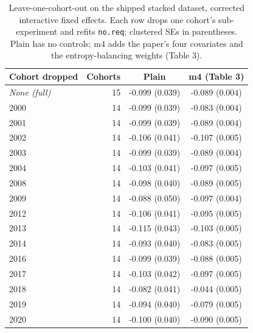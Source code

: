 \begin{table}[t]\centering
\caption{Leave-one-cohort-out on the shipped stacked dataset, corrected interactive fixed effects. Each row drops one cohort's sub-experiment and refits \texttt{no.req}; clustered SEs in parentheses. Plain has no controls; m4 adds the paper's four covariates and the entropy-balancing weights (Table 3).}
\label{tab:loo-shipped}
\begin{tabular}{lrcc}
\toprule
Cohort dropped & Cohorts & Plain & m4 (Table 3) \\
\midrule
\textit{None (full)} & 15 & -0.099 (0.039) & -0.089 (0.004) \\
\midrule
2000 & 14 & -0.099 (0.039) & -0.083 (0.004) \\
2001 & 14 & -0.099 (0.039) & -0.089 (0.004) \\
2002 & 14 & -0.106 (0.041) & -0.107 (0.005) \\
2003 & 14 & -0.099 (0.039) & -0.089 (0.004) \\
2004 & 14 & -0.103 (0.041) & -0.097 (0.005) \\
2008 & 14 & -0.098 (0.040) & -0.089 (0.005) \\
2009 & 14 & -0.088 (0.050) & -0.097 (0.004) \\
2012 & 14 & -0.106 (0.041) & -0.095 (0.005) \\
2013 & 14 & -0.115 (0.043) & -0.103 (0.005) \\
2014 & 14 & -0.093 (0.040) & -0.083 (0.005) \\
2016 & 14 & -0.099 (0.039) & -0.088 (0.005) \\
2017 & 14 & -0.103 (0.042) & -0.097 (0.005) \\
2018 & 14 & -0.082 (0.041) & -0.044 (0.005) \\
2019 & 14 & -0.094 (0.040) & -0.079 (0.005) \\
2020 & 14 & -0.100 (0.040) & -0.090 (0.005) \\
\bottomrule
\end{tabular}
\end{table}

